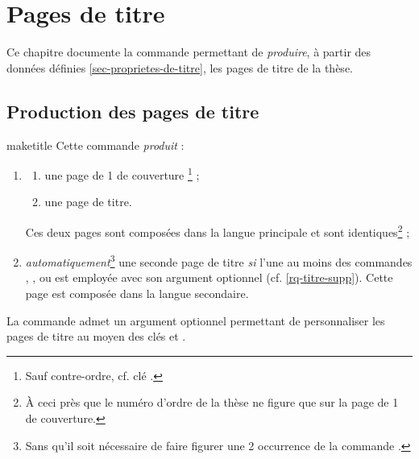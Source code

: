 \chapter{Pages de titre}\label{cha-pages-de-titre}

Ce chapitre documente la commande  permettant de
\emph{produire}, à partir des données définies \vref{sec-proprietes-de-titre},
les pages de titre de la thèse.

\section{Production des pages de titre}

\begin{docCommand}[doc description=\mandatory]{maketitle}{}%
  Cette commande \emph{produit} :
  \begin{enumerate}
  \item
    \begin{enumerate}
    \item une page de 1\iere{} de couverture%
      \footnote{Sauf contre-ordre, cf. clé .} ;
    \item une page de titre.
    \end{enumerate}
    Ces deux pages sont composées dans la langue principale et
    sont identiques\footnote{À ceci près que le numéro d'ordre de la thèse ne figure
      que sur la page de 1\iere{} de couverture.} ;
  \item \emph{automatiquement}\footnote{Sans qu'il soit nécessaire de faire
      figurer une 2\ieme{} occurrence de la commande .} une
    seconde page de titre \emph{si}  l'une au moins des
    commandes , ,  ou
     est employée avec son argument optionnel
    (cf. \vref{rq-titre-supp}). Cette page est composée dans la langue
    secondaire.
  \end{enumerate}
\end{docCommand}

La commande  admet un argument optionnel permettant de
personnaliser les pages de titre au moyen des clés  et
.%
%
%


